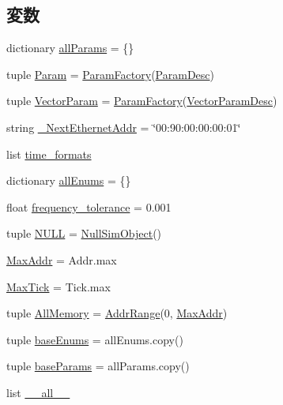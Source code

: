 \subsection*{変数}
\begin{DoxyCompactItemize}
\item 
dictionary \hyperlink{namespacem5_1_1params_a06efa45a130c5af1c44cf934deab65a4}{allParams} = \{\}
\item 
tuple \hyperlink{namespacem5_1_1params_a14d3aee4aac12be641ec918c73cfcd9c}{Param} = \hyperlink{classm5_1_1params_1_1ParamFactory}{ParamFactory}(\hyperlink{classm5_1_1params_1_1ParamDesc}{ParamDesc})
\item 
tuple \hyperlink{namespacem5_1_1params_a0aa742350ec1fee12b7dc7ecacef2b38}{VectorParam} = \hyperlink{classm5_1_1params_1_1ParamFactory}{ParamFactory}(\hyperlink{classm5_1_1params_1_1VectorParamDesc}{VectorParamDesc})
\item 
string \hyperlink{namespacem5_1_1params_a43bfeae6ef54f4f9ec21badccc67e9ae}{\_\-NextEthernetAddr} = \char`\"{}00:90:00:00:00:01\char`\"{}
\item 
list \hyperlink{namespacem5_1_1params_a878cd16311a4da1b6c4ac703b9cb6034}{time\_\-formats}
\item 
dictionary \hyperlink{namespacem5_1_1params_ac638387418e5ecba77bb5d63b4b1a0c0}{allEnums} = \{\}
\item 
float \hyperlink{namespacem5_1_1params_ab05a03249670abb258a9dd7c2a435443}{frequency\_\-tolerance} = 0.001
\item 
tuple \hyperlink{namespacem5_1_1params_a1e2e219ac4e913a2c59019be3094d3ca}{NULL} = \hyperlink{classm5_1_1params_1_1NullSimObject}{NullSimObject}()
\item 
\hyperlink{namespacem5_1_1params_a1f3beab4ce06468d9eb110330d9b711e}{MaxAddr} = Addr.max
\item 
\hyperlink{namespacem5_1_1params_ace890b2e52c70259bb9ff990f8a46467}{MaxTick} = Tick.max
\item 
tuple \hyperlink{namespacem5_1_1params_a428a9309d0b585b0ab7d05b1e24ca142}{AllMemory} = \hyperlink{classm5_1_1params_1_1AddrRange}{AddrRange}(0, \hyperlink{namespacem5_1_1params_a1f3beab4ce06468d9eb110330d9b711e}{MaxAddr})
\item 
tuple \hyperlink{namespacem5_1_1params_a8ff5886dbaff6191e6c85b9078bb2063}{baseEnums} = allEnums.copy()
\item 
tuple \hyperlink{namespacem5_1_1params_a542b78de70b6b66bea95400812abcc3d}{baseParams} = allParams.copy()
\item 
list \hyperlink{namespacem5_1_1params_aa4a022e6ddacd362b83964da5cc5d044}{\_\-\_\-all\_\-\_\-}
\end{DoxyCompactItemize}


